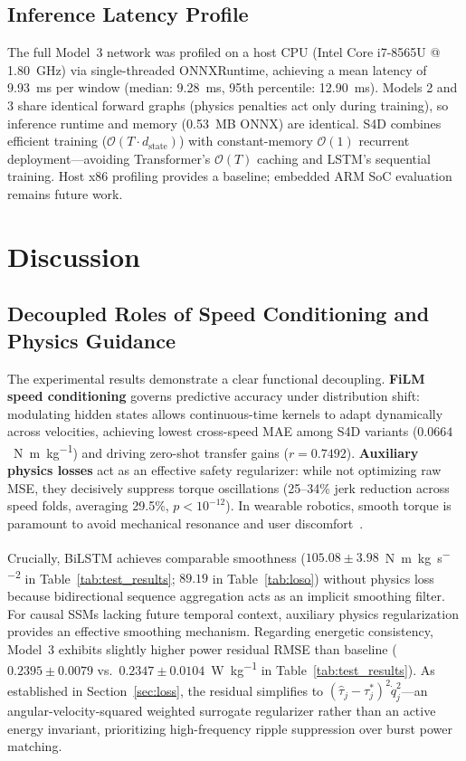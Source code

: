 \documentclass[journal]{IEEEtran}
\newcommand{\dstate}{d_{\mathrm{state}}}
\newcommand{\dotq}{\dot{q}}
\newcommand{\Nmskg}{\si{\newton\metre\per\kilogram}}
\newcommand{\Nmskgsq}{\si{\newton\metre\per\kilogram\per\second\squared}}
\newcommand{\Wkg}{\si{\watt\per\kilogram}}
\begin{document}
\subsection{Inference Latency Profile}
The full Model~3 network was profiled on a host CPU (Intel Core i7-8565U @ 1.80~GHz) via single-threaded ONNXRuntime, achieving a mean latency of 9.93~\si{\milli\second} per window (median: 9.28~\si{\milli\second}, 95th percentile: 12.90~\si{\milli\second}). Models 2 and 3 share identical forward graphs (physics penalties act only during training), so inference runtime and memory (0.53~MB ONNX) are identical. S4D combines efficient training ($\mathcal{O}(T \cdot \dstate)$) with constant-memory $\mathcal{O}(1)$ recurrent deployment---avoiding Transformer's $\mathcal{O}(T)$ caching and LSTM's sequential training. Host x86 profiling provides a baseline; embedded ARM SoC evaluation remains future work.

\section{Discussion}
\label{sec:discussion}

\subsection{Decoupled Roles of Speed Conditioning and Physics Guidance}
The experimental results demonstrate a clear functional decoupling. \textbf{FiLM speed conditioning} governs predictive accuracy under distribution shift: modulating hidden states allows continuous-time kernels to adapt dynamically across velocities, achieving lowest cross-speed MAE among S4D variants ($0.0664$~\Nmskg{}) and driving zero-shot transfer gains ($r = 0.7492$). \textbf{Auxiliary physics losses} act as an effective safety regularizer: while not optimizing raw MSE, they decisively suppress torque oscillations (25--34\% jerk reduction across speed folds, averaging 29.5\%, $p < 10^{-12}$). In wearable robotics, smooth torque is paramount to avoid mechanical resonance and user discomfort~\cite{tucker2015control, baud2021review}.

Crucially, BiLSTM achieves comparable smoothness ($105.08 \pm 3.98$~\Nmskgsq{} in Table~\ref{tab:test_results}; $89.19$ in Table~\ref{tab:loso}) without physics loss because bidirectional sequence aggregation acts as an implicit smoothing filter. For causal SSMs lacking future temporal context, auxiliary physics regularization provides an effective smoothing mechanism. Regarding energetic consistency, Model~3 exhibits slightly higher power residual RMSE than baseline ($0.2395 \pm 0.0079$ vs.\ $0.2347 \pm 0.0104$~\Wkg{} in Table~\ref{tab:test_results}). As established in Section~\ref{sec:loss}, the residual simplifies to $(\hat{\tau}_j - \tau_j^*)^2 \dotq_j^2$---an angular-velocity-squared weighted surrogate regularizer rather than an active energy invariant, prioritizing high-frequency ripple suppression over burst power matching.
\end{document}
